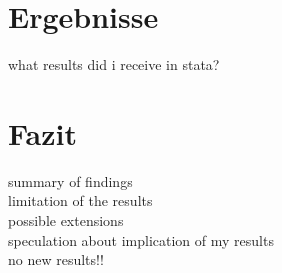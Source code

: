 \documentclass[a4paper,11pt]{scrartcl}
\begin{document}
\newpage
\section{Ergebnisse}
what results did i receive in stata?

\newpage
\section{Fazit}
summary of findings\\
limitation of the results\\
possible extensions\\
speculation about implication of my results\\
no new results!!


\clearpage 
{}
{}	
\nocite{*}
\printbibliography




 
\end{document}

